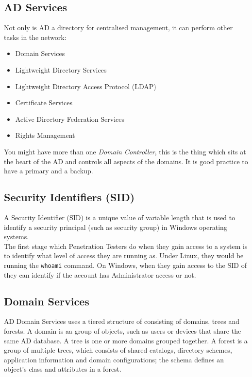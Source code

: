 \subsection{AD Services}
Not only is AD a directory for centralised management, it can perform other tasks in the network:
\begin{itemize}
    \item Domain Services
    \item Lightweight Directory Services
    \item Lightweight Directory Access Protocol (LDAP)
    \item Certificate Services
    \item Active Directory Federation Services
    \item Rights Management
\end{itemize}

You might have more than one \textit{Domain Controller}, this is the thing which sits at the heart of the AD and controls all aspects of the domains. It is good practice to have a primary and a backup. 

\subsection{Security Identifiers (SID)}
A Security Identifier (SID) is a unique value of variable length that is used to identify a security principal (such as security group) in Windows operating systems.\\

The first stage which Penetration Testers do when they gain access to a system is to identify what level of access they are running as. Under Linux, they would be running the \verb|whoami| command. On Windows, when they gain access to the SID of they can identify if the account has Administrator access or not.


\subsection{Domain Services}
AD Domain Services uses a tiered structure of consisting of domains, trees and forests. A domain is aa group of objects, such as users or devices that share the same AD database. A tree is one or more domains grouped together. A forest is a group of multiple trees, which consists of shared catalogs, directory schemes, application information and domain configurations; the schema defines an object's class and attributes in a forest. \\

